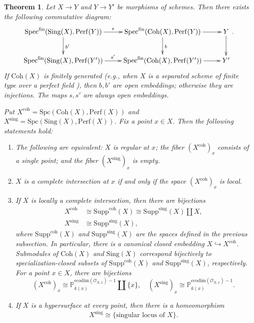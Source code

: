 \documentclass[11pt]{amsart}
\theoremstyle{definition}
\theoremstyle{plain}
\newtheorem{thm}[defn]{Theorem}
\theoremstyle{remark}
\newcommand{\perf}{\mathrm{Perf}}
\newcommand{\coh}{{\mathrm{Coh}}}
\newcommand{\Spec}{\mathrm{Spec}}
\newcommand{\mo}{\mathrm}
\newcommand{\Supp}{\mathrm{Supp}}
\newcommand{\sO}{\mathscr{O}}
\newcommand{\Sing}{\mathrm{Sing}}
\newcommand{\Spc}{\mathrm{Spc}}
\numberwithin{equation}{section}
\begin{document}
\begin{thm}\label{2-19}
Let \(X\to Y\) and \(Y\to Y'\) be morphisms of schemes.
Then there exists the following commutative diagram:
\[
\xymatrix{
\Spec^{\mo{fin}}(\Sing(X),\perf(Y))\ar[r]^s\ar[d]^{b'}&
\Spec^{\mo{fin}}(\coh(X),\perf(Y))\ar[d]^b\ar[r]&
Y\ar[d]\\
\Spec^{\mo{fin}}(\Sing(X),\perf(Y'))\ar[r]^{s'}&
\Spec^{\mo{fin}}(\coh(X),\perf(Y'))\ar[r]&
Y'}.
\]
If \(\coh(X)\) is finitely generated (e.g., when \(X\) is a separated scheme of finite type over a perfect field \cite[Theorem 7.39]{Ro}), then \(b,b'\) are open embeddings; otherwise they are injections.
The maps \(s,s'\) are always open embeddings.

Put \(X^{\mo{coh}}=\Spc(\coh(X),\perf(X))\) and \(X^{\mo{sing}}=\Spc(\Sing(X),\perf(X))\).
Fix a point \(x\in X\).
Then the following statements hold:
\begin{enumerate}
\item The following are equivalent: \(X\) is regular at \(x\); the fiber \((X^{\mo{coh}})_x\) consists of a single point; and the fiber \((X^{\mo{sing}})_x\) is empty.
\item \(X\) is a complete intersection at \(x\) if and only if the space \((X^{\mo{coh}})_x\) is local.
\item If \(X\) is locally a complete intersection, then there are bijections
\begin{align*}
X^{\mo{coh}} &\cong \Supp^{\mo{coh}}(X)\cong \Supp^{\mo{sing}}(X)\coprod X,\\
X^{\mo{sing}} &\cong \Supp^{\mo{sing}}(X),
\end{align*}
where \(\Supp^{\mo{coh}}(X)\) and \(\Supp^{\mo{sing}}(X)\) are the spaces defined in the previous subsection.  
In particular, there is a canonical closed embedding \(X \hookrightarrow X^{\mo{coh}}\).
Submodules of \(\coh(X)\) and \(\Sing(X)\) correspond bijectively to specialization-closed subsets of \(\Supp^{\mo{coh}}(X)\) and \(\Supp^{\mo{sing}}(X)\), respectively.  
For a point \(x\in X\), there are bijections
\[
(X^{\mo{coh}})_x \cong \mathbb{P}_{k(x)}^{\mo{ecodim}(\sO_{X,x})-1}\coprod \{x\},\quad 
(X^{\mo{sing}})_x \cong \mathbb{P}_{k(x)}^{\mo{ecodim}(\sO_{X,x})-1}.
\]



\item If \(X\) is a hypersurface at every point, then there is a homeomorphism
\[
X^{\mo{sing}}\cong \{\text{singular locus of }X\}.
\]
\end{enumerate}
\end{thm}
\end{document}
